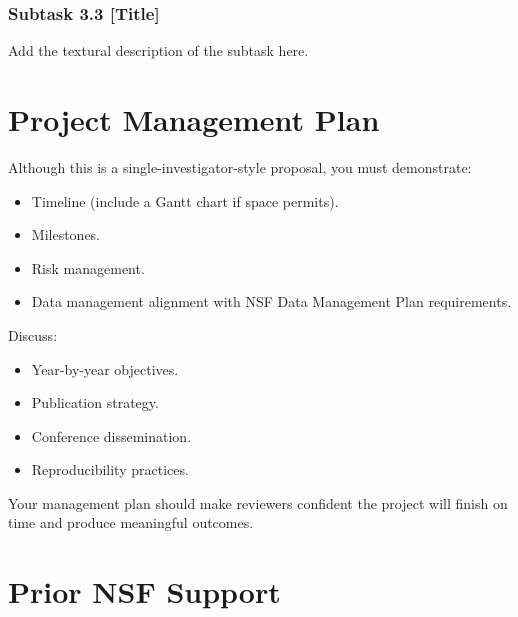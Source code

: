 \documentclass[11pt,letterpaper]{article}
\begin{document}
{\subsubsection*{Subtask 3.3 [Title]}
Add the textural description of the subtask here.

\section{Project Management Plan}

Although this is a single-investigator-style proposal, you must demonstrate:
\begin{itemize}
    \item Timeline (include a Gantt chart if space permits).
    \item Milestones.
    \item Risk management.
    \item Data management alignment with NSF Data Management Plan requirements.
\end{itemize}
Discuss:
\begin{itemize}
    \item Year-by-year objectives.
    \item Publication strategy.
    \item Conference dissemination.
    \item Reproducibility practices.
\end{itemize}

Your management plan should make reviewers confident the project will finish on time and produce meaningful outcomes.


\section{Prior NSF Support}

}
\end{document}
